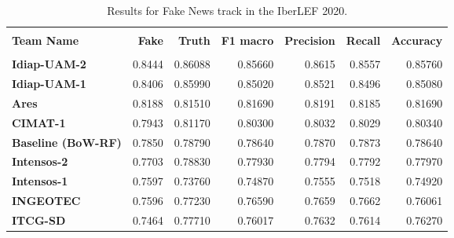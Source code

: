 \begin{table}[H]
    \centering
    \changefontsizes{9pt}
    \begin{tabular}{lrrrrrr}\hline
        \\
        \textbf{Team Name}         & \textbf{Fake} & \textbf{Truth} & \textbf{F1 macro} & \textbf{Precision} & \textbf{Recall} & \textbf{Accuracy} \\\hline
        \\[-0.1cm]
        \textbf{Idiap-UAM-2}       & 0.8444        & 0.86088        & 0.85660           & 0.8615             & 0.8557          & 0.85760           \\
        \textbf{Idiap-UAM-1}       & 0.8406        & 0.85990        & 0.85020           & 0.8521             & 0.8496          & 0.85080           \\
        \textbf{Ares}              & 0.8188        & 0.81510        & 0.81690           & 0.8191             & 0.8185          & 0.81690           \\
        \textbf{CIMAT-1}           & 0.7943        & 0.81170        & 0.80300           & 0.8032             & 0.8029          & 0.80340           \\
        \textbf{Baseline (BoW-RF)} & 0.7850        & 0.78790        & 0.78640           & 0.7870             & 0.7873          & 0.78640           \\
        \textbf{Intensos-2}        & 0.7703        & 0.78830        & 0.77930           & 0.7794             & 0.7792          & 0.77970           \\
        \textbf{Intensos-1}        & 0.7597        & 0.73760        & 0.74870           & 0.7555             & 0.7518          & 0.74920           \\
        \textbf{INGEOTEC}          & 0.7596        & 0.77230        & 0.76590           & 0.7659             & 0.7662          & 0.76061           \\
        \textbf{ITCG-SD}           & 0.7464        & 0.77710        & 0.76017           & 0.7632             & 0.7614          & 0.76270           \\\hline
    \end{tabular}
    \normalsize
    \caption{Results for Fake News track in the IberLEF 2020.}
    \label{table:fakenews}
\end{table}